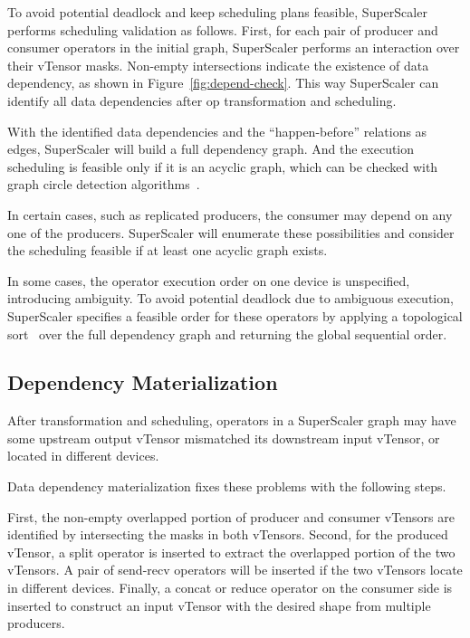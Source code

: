 To avoid potential deadlock and keep scheduling plans feasible, {SuperScaler} performs scheduling validation as follows. First, for each pair of producer and consumer operators in the initial graph,  {SuperScaler} performs an interaction over their vTensor masks. Non-empty intersections indicate the existence of data dependency, as shown in Figure~\ref{fig:depend-check}. This way {SuperScaler} can identify all data dependencies after op transformation and scheduling. 

With the identified data dependencies and the ``happen-before'' relations as edges, {SuperScaler} will build a full dependency graph. And the execution scheduling is feasible only if it is an acyclic graph, which can be checked with graph circle detection algorithms~\cite{DFS}.

In certain cases, such as replicated producers, the consumer may depend on any one of the producers. {SuperScaler} will enumerate these possibilities and consider the scheduling feasible if at least one acyclic graph exists.

In some cases, the operator execution order on one device is unspecified, introducing ambiguity. To avoid potential deadlock due to ambiguous execution, {SuperScaler} specifies a feasible order for these operators by applying a topological sort~\cite{toposort} over the full dependency graph and returning the global sequential order. 

\subsection{Dependency Materialization}
\label{subsec:data-material}

After transformation and scheduling, operators in a {SuperScaler} graph may have some upstream output vTensor mismatched its downstream input vTensor, or located in different devices.

Data dependency materialization fixes these problems with the following steps. 

First, the non-empty overlapped portion of producer and consumer vTensors are identified by intersecting the masks in both vTensors. Second, for the produced vTensor, a split operator is inserted to extract the overlapped portion of the two vTensors. A pair of send-recv operators will be inserted if the two vTensors locate in different devices. Finally, a concat or reduce operator on the consumer side is inserted to construct an input vTensor with the desired shape from multiple producers.

